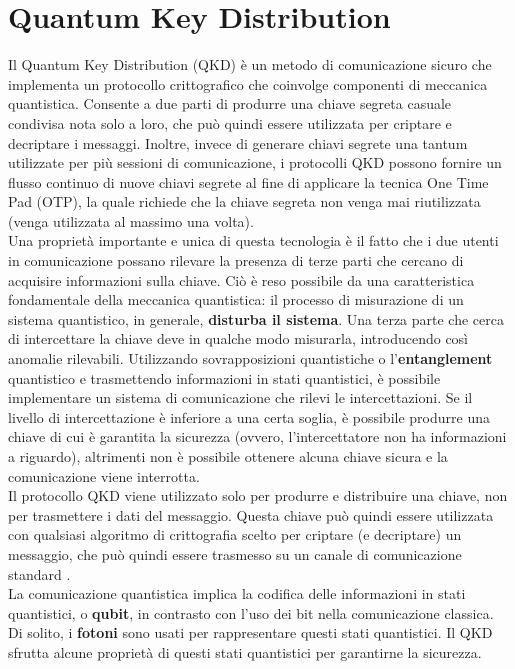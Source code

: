 \chapter{Quantum Key Distribution}
Il Quantum Key Distribution (QKD) è un metodo di comunicazione sicuro che implementa un protocollo crittografico che coinvolge componenti di meccanica quantistica. Consente a due parti di produrre una chiave segreta casuale condivisa nota solo a loro, che può quindi essere utilizzata per criptare e decriptare i messaggi. Inoltre, invece di generare chiavi segrete una tantum utilizzate per più sessioni di comunicazione, i protocolli QKD possono fornire un flusso continuo di nuove chiavi segrete al fine di applicare la tecnica One Time Pad (OTP), la quale richiede che la chiave segreta non venga mai riutilizzata (venga utilizzata al massimo una volta).\\
Una proprietà importante e unica di questa tecnologia è il fatto che i due utenti in comunicazione possano rilevare la presenza di terze parti che cercano di acquisire informazioni sulla chiave. Ciò è reso possibile da una caratteristica fondamentale della meccanica quantistica: il processo di misurazione di un sistema quantistico, in generale, \textbf{disturba il sistema}. Una terza parte che cerca di intercettare la chiave deve in qualche modo misurarla, introducendo così anomalie rilevabili. Utilizzando sovrapposizioni quantistiche o l'\textbf{entanglement} quantistico e trasmettendo informazioni in stati quantistici, è possibile implementare un sistema di comunicazione che rilevi le intercettazioni. Se il livello di intercettazione è inferiore a una certa soglia, è possibile produrre una chiave di cui è garantita la sicurezza (ovvero, l'intercettatore non ha informazioni a riguardo), altrimenti non è possibile ottenere alcuna chiave sicura e la comunicazione viene interrotta.\\
Il protocollo QKD viene utilizzato solo per produrre e distribuire una chiave, non per trasmettere i dati del messaggio. Questa chiave può quindi essere utilizzata con qualsiasi algoritmo di crittografia scelto per criptare (e decriptare) un messaggio, che può quindi essere trasmesso su un canale di comunicazione standard \cite{shannon_communication_1949}.\\
La comunicazione quantistica implica la codifica delle informazioni in stati quantistici, o \textbf{qubit}, in contrasto con l'uso dei bit nella comunicazione classica. Di solito, i \textbf{fotoni} sono usati per rappresentare questi stati quantistici. Il QKD sfrutta alcune proprietà di questi stati quantistici per garantirne la sicurezza.\newpage
